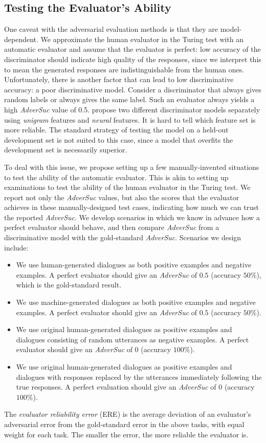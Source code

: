 \documentclass[11pt]{article}
\newenvironment{tightitemize}{\begin{itemize}[topsep=0pt, partopsep=0pt] \setlength{\itemsep}{0pt}\setlength{\parskip}{0pt}}{\end{itemize}}
\begin{document}
\subsection{Testing the Evaluator's Ability}
One caveat  with the adversarial evaluation methods is that 
they are model-dependent. 
We approximate the human evaluator in the Turing test with an automatic evaluator and assume that the evaluator is perfect: low accuracy of the discriminator should indicate high quality of the responses, since we interpret this to mean the generated responses are indistinguishable from the human ones. Unfortunately, there is another factor that can lead to low discriminative accuracy: a poor discriminative model. 
 Consider a  discriminator that always gives random labels or always gives the same label.
 Such an evaluator 
   always yields a high {\it AdverSuc} value of 0.5. 
    propose  two different discriminator models 
separately using {\it unigram} features and {\it neural} features. It is hard to tell which feature set is more reliable. 
The standard strategy of testing the model on a held-out development set is not suited to this case, since a model that overfits the development set is necessarily superior. 


To deal with this issue, we propose setting up a few manually-invented situations to test the ability of the automatic evaluator.
 This is akin to setting up  examinations to test the ability of the human evaluator in the Turing test. 
We  report not only the {\it AdverSuc} values,  but also the scores that the evaluator
achieves
 in these manually-designed test cases, indicating how much we can trust the reported {\it AdverSuc}. 
 We develop scenarios in which we know  in advance how a perfect evaluator should behave, and then compare   {\it AdverSuc}  from a discriminative model with the gold-standard  {\it AdverSuc}. Scenarios we design include:
 \begin{tightitemize}
 \item We use human-generated dialogues as both positive examples and negative examples. A perfect evaluator should give an {\it AdverSuc} of $0.5$ (accuracy $50\%$), which is the gold-standard result.
  \item We use machine-generated dialogues as both positive examples and negative examples. A perfect evaluator should give an {\it AdverSuc} of $0.5$ (accuracy $50\%$).
 \item We use original human-generated dialogues as positive examples and dialogues 
 consisting of
  random utterances 
  as negative examples. A perfect evaluator should give an {\it AdverSuc} of $0$ (accuracy $100\%$).
 \item We use original human-generated dialogues as positive examples and dialogues with 
 responses replaced by the utterances immediately following the true responses. 
 A perfect evaluation should give an {\it AdverSuc} of $0$ (accuracy $100\%$).
\end{tightitemize}
The {\it evaluator reliability error} (ERE) is the average deviation of an evaluator's adversarial error
 from the gold-standard error in the above tasks, with equal weight for each task. 
The smaller the error, the more reliable the evaluator is. 
\end{document}
